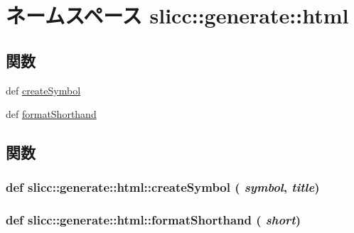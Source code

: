 \hypertarget{namespaceslicc_1_1generate_1_1html}{
\section{ネームスペース slicc::generate::html}
\label{namespaceslicc_1_1generate_1_1html}
}
\subsection*{関数}
\begin{DoxyCompactItemize}
\item 
def \hyperlink{namespaceslicc_1_1generate_1_1html_afe7347b33e29a31ff6b4a3093c9c7e9f}{createSymbol}
\item 
def \hyperlink{namespaceslicc_1_1generate_1_1html_aa54ddafc064a401d182be1e891fe33a2}{formatShorthand}
\end{DoxyCompactItemize}


\subsection{関数}
\hypertarget{namespaceslicc_1_1generate_1_1html_afe7347b33e29a31ff6b4a3093c9c7e9f}{
\subsubsection[{createSymbol}]{\setlength{\rightskip}{0pt plus 5cm}def slicc::generate::html::createSymbol ( {\em symbol}, \/   {\em title})}}
\label{namespaceslicc_1_1generate_1_1html_afe7347b33e29a31ff6b4a3093c9c7e9f}



\hypertarget{namespaceslicc_1_1generate_1_1html_aa54ddafc064a401d182be1e891fe33a2}{
\subsubsection[{formatShorthand}]{\setlength{\rightskip}{0pt plus 5cm}def slicc::generate::html::formatShorthand ( {\em short})}}
\label{namespaceslicc_1_1generate_1_1html_aa54ddafc064a401d182be1e891fe33a2}



